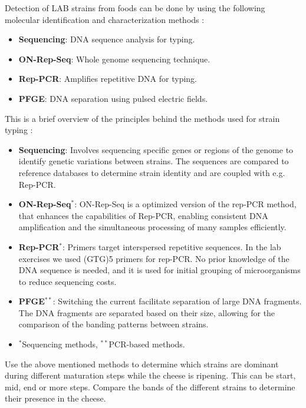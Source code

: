 Detection of LAB strains from foods can be done by using the following molecular identification and characterization methods \cite*{LS05}:
\begin{itemize}
    \item \textbf{Sequencing}: DNA sequence analysis for typing.
    \item \textbf{ON-Rep-Seq}: Whole genome sequencing technique.
    \item \textbf{Rep-PCR}: Amplifies repetitive DNA for typing.
    \item \textbf{PFGE}: DNA separation using pulsed electric fields.
\end{itemize}

This is a brief overview of the principles behind the methods used for strain typing \cite*{LS09,L3-SeqBasedClass}:
\begin{itemize}
    \item \textbf{Sequencing}: Involves sequencing specific genes or regions of the genome to identify genetic variations between strains. The sequences are compared to reference databases to determine strain identity and are coupled with e.g. Rep-PCR.
    \item \textbf{ON-Rep-Seq$^*$}: ON-Rep-Seq is a optimized version of the rep-PCR method, that enhances the capabilities of Rep-PCR, enabling consistent DNA amplification and the simultaneous processing of many samples efficiently.
    \item \textbf{Rep-PCR$^*$}: Primers target interspersed repetitive sequences. In the lab exercises we used (GTG)5 primers for rep-PCR. No prior knowledge of the DNA sequence is needed, and it is used for initial grouping of microorganisms to reduce sequencing costs.
    \item \textbf{PFGE$^{**}$}: Switching the current facilitate separation of large DNA fragments. The DNA fragments are separated based on their size, allowing for the comparison of the banding patterns between strains.
    \item $^*$Sequencing methods, $^{**}$PCR-based methods.
\end{itemize}

\vspace{0.5em}
Use the above mentioned methods to determine which strains are dominant during different maturation steps while the cheese is ripening. This can be start, mid, end or more steps. Compare the bands of the different strains to determine their presence in the cheese.

